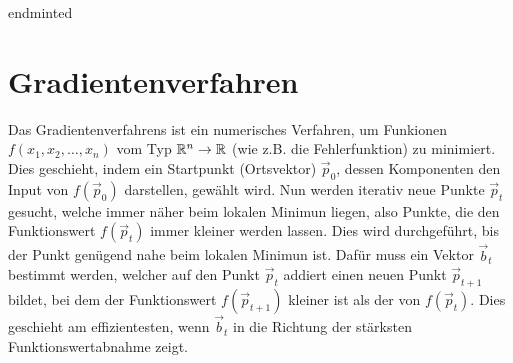 \begin{appendices}
end{minted}

\chapter{Gradientenverfahren}\label{sec:anhang_gd}
Das Gradientenverfahrens ist ein numerisches Verfahren, um Funkionen $f(x_1,
x_2, \ldots, x_n)$ vom Typ $\mathbb{R}^n \to \mathbb{R}$ (wie z.B. die Fehlerfunktion)
zu minimiert.
Dies geschieht, indem ein Startpunkt (Ortsvektor) $\vec{p}_0$, dessen
Komponenten den Input von $f(\vec{p}_0)$ darstellen, gewählt wird.
Nun werden iterativ neue Punkte $\vec{p}_t$ gesucht, welche immer näher beim lokalen Minimun liegen, also Punkte, die den Funktionswert $f(\vec{p}_t)$ immer kleiner werden lassen.
Dies wird durchgeführt, bis der Punkt genügend nahe beim lokalen Minimun ist.
\para{}
Dafür muss ein Vektor $\vec{b}_t$ bestimmt werden, welcher auf den Punkt $\vec{p}_t$ addiert einen neuen Punkt $\vec{p}_{t+1}$ bildet,
bei dem der Funktionswert $f(\vec{p}_{t+1})$ kleiner ist als der von $f(\vec{p}_t)$.
Dies geschieht am effizientesten, wenn $\vec{b}_t$ in die Richtung der stärksten Funktionswertabnahme zeigt.


\end{appendices}
